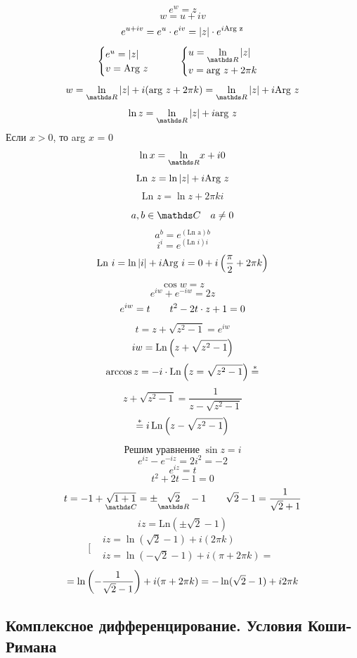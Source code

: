 \documentclass[main]{subfiles}
\begin{document}
	\begin{Definition} 
		\[e^w = z\]
		\[w = u + iv\]
		\[e^{u + iv} = e^u \cdot e^{iv} = \left|z\right| \cdot e^{i \text{Arg z}} \]
		\[\begin{cases}
				e^u = \abs{z} \\
				v = \text{Arg } z
			\end{cases} \qq \begin{cases}
				u = \us{\R}{\ln} \abs{z} \\
				v = \text{arg } z + 2 \pi k
			\end{cases}\]
		\[w = \us{\R}{\ln} \abs{z} + i (\text{arg } z + 2\pi k) = \us{\R}{\ln } \abs{z} + i \text{Arg } z\]
		\[\ln z = \us{\R}{\ln}\abs{z} + i \text{arg } z\]
		Если $x > 0$, то arg $x$ = 0
		\[\ln x = \us{\R}{\ln} x + i0\]
		\[\text{Ln } z = \ln \left|z\right| + i \text{Arg } z\]
		\[\text{Ln } z = \ln z + 2 \pi k i\]

		\[a, b \in \CC \q a \neq 0\]
		\[a^b = e ^ {(\text{Ln a})b}\]
		\[i^i = e^{(\text{Ln } i)i} \]
		\[\text{Ln } i = \ln \left|i\right| + i \text{Arg } i = 0 + i \left(\frac{\pi}{2} + 2 \pi k\right)\]
	\end{Definition}

	\begin{Definition} 
		\[\cos w = z\]
		\[e^{iw} + e^{-iw} = 2z\]
		\[e^{iw} = t \qquad t^2 - 2t \cdot z + 1 = 0\]
		\[t = z + \sqrt{z^2 - 1} = e^{iw} \]
		\[iw = \mathop{\rm Ln}\nolimits \left(z + \sqrt{z^2 - 1}\right)\]
		\[\arccos z = -i \cdot \mathop{\rm Ln}\nolimits \left(z = \sqrt{z^2 - 1}\right)  \overset{*}{=}\]
		\[z + \sqrt{z^2 - 1} = \frac{1}{z - \sqrt{z^2  - 1}}\]
		\[\overset{*}{=} i \mathop{\rm Ln}\nolimits \left(z - \sqrt{z^2 - 1}\right)\]
	\end{Definition}

	\begin{Example}
		\[\text{Решим уравнение } \sin z = i\]
		\[e^{iz} - e^{-iz} = 2i^2 = -2  \]
		\[e^{iz}  = t\]
		\[t^2 + 2t - 1 = 0\]
		\[t = -1 + \us{\CC}{\sqrt{1 + 1}} = \pm \us{\R}{\sqrt{2}} - 1 \qq \sqrt{2} - 1 = \frac{1}{\sqrt{2} + 1}\]
		\[iz = \text{Ln} (\pm \sqrt{2} - 1)\]
		\[\bigg[\begin{align}
				 & iz = \ln(\sqrt{2} - 1) + i (2 \pi k)          \\
				 & iz = \ln(-\sqrt{2} - 1) + i (\pi + 2 \pi k) =
			\end{align}\]
		\[ = \ln\left(- \frac{1}{\sqrt{2} - 1}\right) + i (\pi + 2\pi k) = -\ln(\sqrt{2} - 1) + i 2 \pi k\]
	\end{Example}

	\newpage
	\subsection{Комплексное дифференцирование. Условия Коши-Римана}
\end{document}
